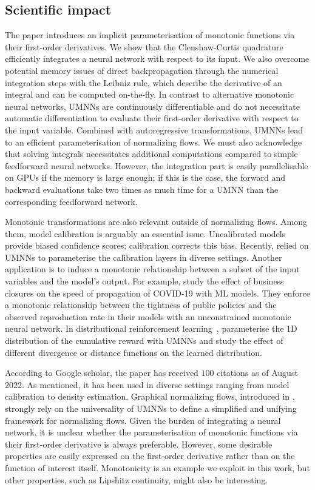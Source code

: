 \subsection{Scientific impact}
The paper introduces an implicit parameterisation of monotonic functions via their first-order derivatives. We show that the Clenshaw-Curtis quadrature efficiently integrates a neural network with respect to its input. We also overcome potential memory issues of direct backpropagation through the numerical integration steps with the Leibniz rule, which describe the derivative of an integral and can be computed on-the-fly. In contrast to alternative monotonic neural networks, UMNNs are continuously differentiable and do not necessitate automatic differentiation to evaluate their first-order derivative with respect to the input variable. Combined with autoregressive transformations, UMNNs lead to an efficient parameterisation of normalizing flows. We must also acknowledge that solving integrals necessitates additional computations compared to simple feedforward neural networks. However, the integration part is easily parallelisable on GPUs if the memory is large enough; if this is the case, the forward and backward evaluations take two times as much time for a UMNN than the corresponding feedforward network.

Monotonic transformations are also relevant outside of normalizing flows. Among them, model calibration is arguably an essential issue. Uncalibrated models provide biased confidence scores; calibration corrects this bias. Recently, \citet{gruber2022trustworthy, deycalibrated, rahimi2020intra} relied on UMNNs to parameterise the calibration layers in diverse settings. Another application is to induce a monotonic relationship between a subset of the input variables and the model's output. For example, \citet{yurk2021county} study the effect of business closures on the speed of propagation of COVID-19 with ML models. They enforce a monotonic relationship between the tightness of public policies and the observed reproduction rate in their models with an unconstrained monotonic neural network. In distributional reinforcement learning~\citep{dabney2018distributional}, \citet{theate2021distributional} parameterise the 1D distribution of the cumulative reward with UMNNs and study the effect of different divergence or distance functions on the learned distribution.

According to Google scholar, the paper has received $100$ citations as of August 2022. As mentioned, it has been used in diverse settings ranging from model calibration to density estimation. Graphical normalizing flows, introduced in , strongly rely on the universality of UMNNs to define a simplified and unifying framework for normalizing flows. Given the burden of integrating a neural network, it is unclear whether the parameterisation of monotonic functions via their first-order derivative is always preferable. However, some desirable properties are easily expressed on the first-order derivative rather than on the function of interest itself. Monotonicity is an example we exploit in this work, but other properties, such as Lipshitz continuity, might also be interesting.


